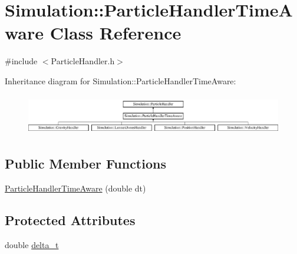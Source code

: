 \hypertarget{classSimulation_1_1ParticleHandlerTimeAware}{\section{Simulation\-:\-:Particle\-Handler\-Time\-Aware Class Reference}
\label{classSimulation_1_1ParticleHandlerTimeAware}
}


{\ttfamily \#include $<$Particle\-Handler.\-h$>$}

Inheritance diagram for Simulation\-:\-:Particle\-Handler\-Time\-Aware\-:\begin{figure}[H]
\begin{center}
\leavevmode
\includegraphics[height=1.794872cm]{classSimulation_1_1ParticleHandlerTimeAware}
\end{center}
\end{figure}
\subsection*{Public Member Functions}
\begin{DoxyCompactItemize}
\item 
\hyperlink{classSimulation_1_1ParticleHandlerTimeAware_a839536b59b78947066e2b9cbf01010fc}{Particle\-Handler\-Time\-Aware} (double dt)
\end{DoxyCompactItemize}
\subsection*{Protected Attributes}
\begin{DoxyCompactItemize}
\item 
double \hyperlink{classSimulation_1_1ParticleHandlerTimeAware_a8c6378b506877c8d69dee8c31f3dfc45}{delta\-\_\-t}
\end{DoxyCompactItemize}



